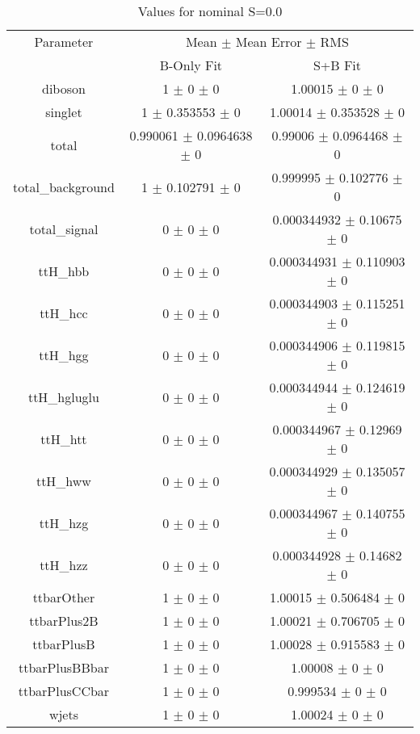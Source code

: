 \begin{table}
\centering
\caption{Values for nominal S=0.0}
\begin{tabular}{ccc}
\toprule
Parameter & \multicolumn{2}{c}{Mean $\pm$ Mean Error $\pm$ RMS}\\
 & B-Only Fit & S+B Fit\\
\midrule
diboson & \num{1} $\pm$ \num{0} $\pm$ \num{0} & \num{1.00015} $\pm$ \num{0} $\pm$ \num{0}\\
singlet & \num{1} $\pm$ \num{0.353553} $\pm$ \num{0} & \num{1.00014} $\pm$ \num{0.353528} $\pm$ \num{0}\\
total & \num{0.990061} $\pm$ \num{0.0964638} $\pm$ \num{0} & \num{0.99006} $\pm$ \num{0.0964468} $\pm$ \num{0}\\
total\_background & \num{1} $\pm$ \num{0.102791} $\pm$ \num{0} & \num{0.999995} $\pm$ \num{0.102776} $\pm$ \num{0}\\
total\_signal & \num{0} $\pm$ \num{0} $\pm$ \num{0} & \num{0.000344932} $\pm$ \num{0.10675} $\pm$ \num{0}\\
ttH\_hbb & \num{0} $\pm$ \num{0} $\pm$ \num{0} & \num{0.000344931} $\pm$ \num{0.110903} $\pm$ \num{0}\\
ttH\_hcc & \num{0} $\pm$ \num{0} $\pm$ \num{0} & \num{0.000344903} $\pm$ \num{0.115251} $\pm$ \num{0}\\
ttH\_hgg & \num{0} $\pm$ \num{0} $\pm$ \num{0} & \num{0.000344906} $\pm$ \num{0.119815} $\pm$ \num{0}\\
ttH\_hgluglu & \num{0} $\pm$ \num{0} $\pm$ \num{0} & \num{0.000344944} $\pm$ \num{0.124619} $\pm$ \num{0}\\
ttH\_htt & \num{0} $\pm$ \num{0} $\pm$ \num{0} & \num{0.000344967} $\pm$ \num{0.12969} $\pm$ \num{0}\\
ttH\_hww & \num{0} $\pm$ \num{0} $\pm$ \num{0} & \num{0.000344929} $\pm$ \num{0.135057} $\pm$ \num{0}\\
ttH\_hzg & \num{0} $\pm$ \num{0} $\pm$ \num{0} & \num{0.000344967} $\pm$ \num{0.140755} $\pm$ \num{0}\\
ttH\_hzz & \num{0} $\pm$ \num{0} $\pm$ \num{0} & \num{0.000344928} $\pm$ \num{0.14682} $\pm$ \num{0}\\
ttbarOther & \num{1} $\pm$ \num{0} $\pm$ \num{0} & \num{1.00015} $\pm$ \num{0.506484} $\pm$ \num{0}\\
ttbarPlus2B & \num{1} $\pm$ \num{0} $\pm$ \num{0} & \num{1.00021} $\pm$ \num{0.706705} $\pm$ \num{0}\\
ttbarPlusB & \num{1} $\pm$ \num{0} $\pm$ \num{0} & \num{1.00028} $\pm$ \num{0.915583} $\pm$ \num{0}\\
ttbarPlusBBbar & \num{1} $\pm$ \num{0} $\pm$ \num{0} & \num{1.00008} $\pm$ \num{0} $\pm$ \num{0}\\
ttbarPlusCCbar & \num{1} $\pm$ \num{0} $\pm$ \num{0} & \num{0.999534} $\pm$ \num{0} $\pm$ \num{0}\\
wjets & \num{1} $\pm$ \num{0} $\pm$ \num{0} & \num{1.00024} $\pm$ \num{0} $\pm$ \num{0}\\
\bottomrule
\end{tabular}
\end{table}